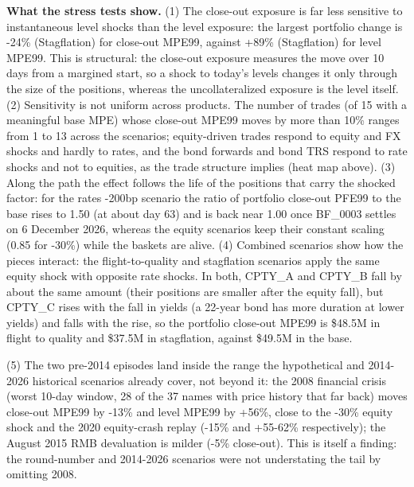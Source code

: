 \documentclass[11pt,letterpaper]{article}
\begin{document}
\textbf{What the stress tests show.} (1) The close-out exposure is far less sensitive to instantaneous level shocks than the level exposure: the largest portfolio change is -24\% (Stagflation) for close-out MPE99, against +89\% (Stagflation) for level MPE99. This is structural: the close-out exposure measures the move over 10 days from a margined start, so a shock to today's levels changes it only through the size of the positions, whereas the uncollateralized exposure is the level itself. (2) Sensitivity is not uniform across products. The number of trades (of 15 with a meaningful base MPE) whose close-out MPE99 moves by more than 10\% ranges from 1 to 13 across the scenarios; equity-driven trades respond to equity and FX shocks and hardly to rates, and the bond forwards and bond TRS respond to rate shocks and not to equities, as the trade structure implies (heat map above). (3) Along the path the effect follows the life of the positions that carry the shocked factor: for the rates -200bp scenario the ratio of portfolio close-out PFE99 to the base rises to 1.50 (at about day 63) and is back near 1.00 once BF\_0003 settles on 6 December 2026, whereas the equity scenarios keep their constant scaling (0.85 for -30\%) while the baskets are alive. (4) Combined scenarios show how the pieces interact: the flight-to-quality and stagflation scenarios apply the same equity shock with opposite rate shocks. In both, CPTY\_A and CPTY\_B fall by about the same amount (their positions are smaller after the equity fall), but CPTY\_C rises with the fall in yields (a 22-year bond has more duration at lower yields) and falls with the rise, so the portfolio close-out MPE99 is \$48.5M in flight to quality and \$37.5M in stagflation, against \$49.5M in the base.

(5) The two pre-2014 episodes land inside the range the hypothetical and 2014-2026 historical scenarios already cover, not beyond it: the 2008 financial crisis (worst 10-day window, 28 of the 37 names with price history that far back) moves close-out MPE99 by -13\% and level MPE99 by +56\%, close to the -30\% equity shock and the 2020 equity-crash replay (-15\% and +55-62\% respectively); the August 2015 RMB devaluation is milder (-5\% close-out). This is itself a finding: the round-number and 2014-2026 scenarios were not understating the tail by omitting 2008.
\end{document}
